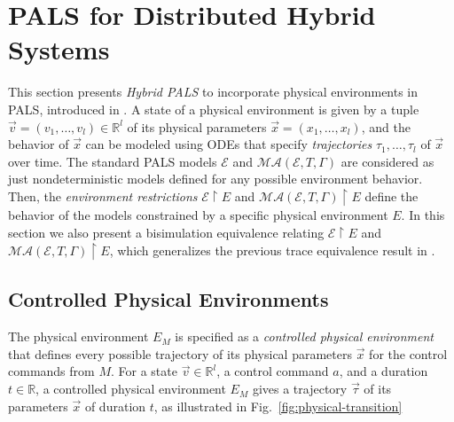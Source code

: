 
\section{PALS for Distributed Hybrid Systems}
\label{sec:hybrid-pals}



This section presents \emph{Hybrid PALS} to incorporate physical environments  
in PALS, introduced in \cite{hybrid-pals}.
A state of a physical environment %
is given by 
a tuple $\vec{v} = (v_1,\ldots,v_l) \in \mathbb{R}^l$ 
of its physical parameters $\vec{x} = (x_1, \ldots,x_l)$,
and
the behavior of %
$\vec{x}$
can be modeled using ODEs that specify \emph{trajectories} 
$\tau_1, \ldots, \tau_l$ of %
$\vec{x}$ over time.
%
The standard PALS models $\mathcal{E}$ and $\mathcal{MA}(\mathcal{E},T,\Gamma)$ 
are considered as just nondeterministic models defined for any possible environment behavior.
Then,
the \emph{environment restrictions} 
$\mathcal{E} \restriction E$ and $\mathcal{MA}(\mathcal{E},T,\Gamma)\restriction E$
 define the behavior of the models 
 constrained by a specific physical  environment $E$.
In this section we also 
present a bisimulation equivalence 
relating $\mathcal{E}\restriction E$ and $\mathcal{MA}(\mathcal{E}, T,\Gamma)\restriction E$,
which generalizes the previous trace equivalence result in \cite{hybrid-pals}.



\subsection{Controlled Physical Environments}



The physical environment $E_M$
is specified as a   \emph{controlled physical environment}
that defines every possible trajectory of its physical parameters $\vec{x}$
for the control commands from $M$.
%
For a state $\vec{v} \in \mathbb{R}^l$, a control command $a$, and a duration $t \in \mathbb{R}$,
a controlled physical environment $E_M$
gives a trajectory $\vec{\tau}$ of its parameters $\vec{x}$ of duration $t$,
as illustrated in Fig.~\ref{fig:physical-transition}

